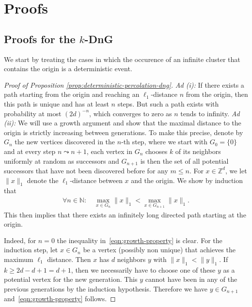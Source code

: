 \documentclass[a4paper, oneside, 11pt]{amsart}
\newcommand{\N}{\mathbb{N}}
\theoremstyle{definition}
\newcommand{\1}{\mathbbm{1}}
\newcommand{\0}{\mathbf{o}}
\newcommand{\Z}{\mathbb{Z}}
\numberwithin{equation}{section}
\begin{document}
 
\section{Proofs}\label{sec:proof}
\subsection{Proofs for the $k$-DnG}\label{sec:proofs-dng}
We start by treating the cases in which the occurence of an infinite cluster that contains the origin is a deterministic event. 
\begin{proof}[Proof of Proposition \ref{prop:deterministic-percolation-dng}]
    \textit{Ad (i):} 
    If there exists a path starting from the origin and reaching an $\ell_1$-distance $n$ from the origin, then this path is unique and has at least $n$ steps. But such a path exists with probability at most $(2d)^{-n}$, which converges to zero as $n$ tends to infinity.
    \medskip
    \newline 
    \textit{Ad (ii):} 
    We will use a growth argument and show that the maximal distance to the origin is strictly increasing between generations. To make this precise, denote by $G_n$ the new vertices discovered in the $n$-th step, where we start with $G_0 = \{0\}$ and at every step $n \leadsto n+1$, each vertex in $G_n$ chooses $k$ of its neighbors uniformly at random as successors and $G_{n+1}$ is then the set of all potential successors that have not been discovered before for any $m  \leq n$. For $x\in\Z^d$, we let $\|x\|_1$ denote the $\ell_1$-distance between $x$ and the origin. We show by induction that 
    \begin{align}\label{eqn:growth-property}
         \forall n  \in \N:   \quad \max_{x \in G_n}\|x\|_1 < \max_{x \in G_{n+1}}\|x\|_1.  
    \end{align}
    This then implies that there exists an infinitely long directed path starting at the origin. 
    
    Indeed, for $n=0$ the inequality in~\eqref{eqn:growth-property} is clear. For the induction step, let $x \in G_n$ be a vertex (possibly non unique) that achieves the maximum $\ell_1$ distance. Then $x$ has $d$ neighbors $y$ with $\|x\|_1 < \|y\|_1$. If $k  \geq 2d-d+1=d+1$, then we necessarily have to choose one of these $y$ as a potential vertex for the new generation. This $y$ cannot have been in any of the previous generations by the induction hypothesis. Therefore we have $y \in G_{n+1}$ and~\eqref{eqn:growth-property} follows. 
\end{proof}
\end{document}
